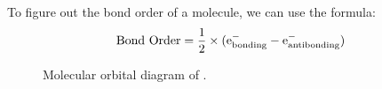 To figure out the bond order of a molecule, we can use the formula:
\begin{equation}\label{eq:bondOrder}
    \text{Bond Order} = \frac{1}{2} \times (\ce{e-}_\text{bonding} - \ce{e-}_\text{antibonding})
\end{equation}
\begin{figure}[h]
    \centering
    \begin{modiagram}[style=square,labels,names,AO-width=8pt,labels-fs=\footnotesize]
        \EnergyAxis
    \end{modiagram}
    \caption{Molecular orbital diagram of .}
\end{figure}